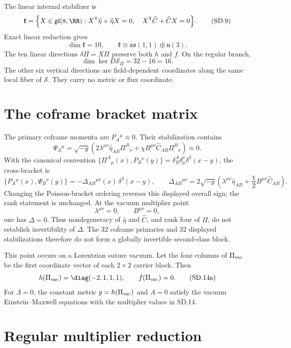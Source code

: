 \documentclass[10pt]{article}
\newcommand{\hateta}{\widehat\eta}
\newcommand{\hatC}{\widehat C}
\begin{document}
The linear internal stabilizer is
\[
\mathfrak k=
\left\{X\in\mathfrak{gl}(8,\RR):
X^{\mathsf T}\hateta+\hateta X=0,\quad
X^{\mathsf T}\hatC+\hatC X=0\right\}.
\tag{SD.9}
\]
Exact linear reduction gives
\[
\dim\mathfrak k=10,
\qquad
\mathfrak k\cong\mathfrak{so}(1,1)\oplus\mathfrak u(3).
\tag{SD.10}
\]
The ten linear directions $\delta\Pi=X\Pi$ preserve both $h$ and $f$.
On the regular branch,
\[
\dim\ker D\mathscr S_\Pi=32-16=16.
\tag{SD.11}
\]
The other six vertical directions are field-dependent coordinates along the
same local fiber of $\mathscr S$. They carry no metric or flux coordinate.

\section{The coframe bracket matrix}

The primary coframe momenta are $P_A{}^\mu\approx0$. Their stabilization
contains
\[
\Psi_A{}^\mu=\sqrt{-g}\left(
2\lambda^{\mu\nu}\hateta_{AB}\Pi^B{}_{\nu}
+\chi B^{\mu\nu}\hatC_{AB}\Pi^B{}_{\nu}\right)\approx0.
\tag{SD.12}
\]
With the canonical convention
$\{\Pi^A{}_{\mu}(x),P_B{}^\nu(y)\}=\delta^A_B\delta_\mu^\nu
\delta^3(x-y)$, the cross-bracket is
\[
\{P_A{}^\mu(x),\Psi_B{}^\nu(y)\}
=-\Delta_{AB}{}^{\mu\nu}(x)\,\delta^3(x-y),
\qquad
\Delta_{AB}{}^{\mu\nu}
=2\sqrt{-g}\left(
\lambda^{\mu\nu}\hateta_{AB}
+\frac\chi2B^{\mu\nu}\hatC_{AB}\right).
\tag{SD.13}
\]
Changing the Poisson-bracket ordering reverses this displayed overall sign;
the rank statement is unchanged.
At the vacuum multiplier point
\[
\lambda^{\mu\nu}=0,\qquad B^{\mu\nu}=0,
\tag{SD.14}
\]
one has $\Delta=0$. Thus nondegeneracy of $\hateta$ and $\hatC$, and rank
four of $\Pi$, do not establish invertibility of $\Delta$. The $32$ coframe
primaries and $32$ displayed stabilizations therefore do not form a globally
invertible second-class block.

This point occurs on a Lorentzian suture vacuum. Let the four columns of
$\Pi_{\rm vac}$ be the first coordinate vector of each $2\times2$ carrier
block. Then
\[
h(\Pi_{\rm vac})=\diag(-2,1,1,1),
\qquad
f(\Pi_{\rm vac})=0.
\tag{SD.14a}
\]
For $\Lambda=0$, the constant metric $g=h(\Pi_{\rm vac})$ and $A=0$ satisfy
the vacuum Einstein--Maxwell equations with the multiplier values in SD.14.

\section{Regular multiplier reduction}
\end{document}
